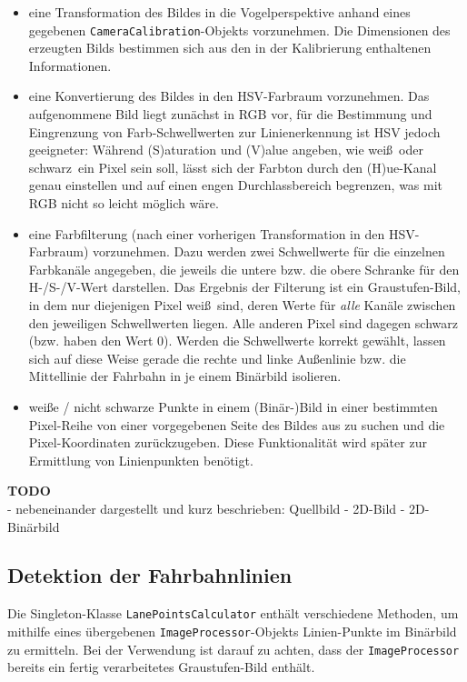 \begin{itemize}
	\item eine Transformation des Bildes in die Vogelperspektive anhand eines gegebenen
	\texttt{CameraCalibration}-Objekts vorzunehmen. Die Dimensionen des erzeugten Bilds bestimmen sich aus
	den in der Kalibrierung enthaltenen Informationen.
	\item eine Konvertierung des Bildes in den HSV-Farbraum vorzunehmen. Das aufgenommene Bild liegt
	zun\"achst in RGB vor, f\"ur die Bestimmung und Eingrenzung von Farb-Schwellwerten zur Linienerkennung
	ist HSV jedoch geeigneter: W\"ahrend (S)aturation und (V)alue angeben,
	wie \glqq wei\ss \grqq\ oder \glqq schwarz\grqq\ ein Pixel
	sein soll, l\"asst sich der Farbton durch den (H)ue-Kanal genau einstellen und auf einen engen
	Durchlassbereich begrenzen, was mit RGB nicht so leicht m\"oglich w\"are.
	\item eine Farbfilterung (nach einer vorherigen Transformation in den HSV-Farbraum) vorzunehmen. Dazu
	werden zwei Schwellwerte f\"ur die einzelnen Farbkan\"ale angegeben, die jeweils die untere bzw. die
	obere Schranke f\"ur den H-/S-/V-Wert darstellen. Das Ergebnis der Filterung ist ein Graustufen-Bild,
	in dem nur diejenigen Pixel wei\ss\ sind, deren Werte f\"ur \textit{alle} Kan\"ale zwischen den
	jeweiligen Schwellwerten liegen. Alle anderen Pixel sind dagegen schwarz (bzw. haben den Wert 0).
	Werden die Schwellwerte korrekt gew\"ahlt, lassen sich auf diese Weise gerade die rechte und linke
	Au\ss enlinie bzw. die Mittellinie der Fahrbahn in je einem Bin\"arbild isolieren.
	\item wei\ss e / nicht schwarze Punkte in einem (Bin\"ar-)Bild in einer bestimmten Pixel-Reihe
	von einer vorgegebenen Seite des Bildes aus zu suchen und die Pixel-Koordinaten zur\"uckzugeben.
	Diese Funktionalit\"at wird sp\"ater zur Ermittlung von Linienpunkten ben\"otigt.
\end{itemize} 

\textbf{TODO}\\
- nebeneinander dargestellt und kurz beschrieben: Quellbild - 2D-Bild - 2D-Bin\"arbild\\

\subsection{Detektion der Fahrbahnlinien}

Die Singleton-Klasse \texttt{LanePointsCalculator} enth\"alt verschiedene Methoden, um mithilfe eines
\"ubergebenen \texttt{ImageProcessor}-Objekts Linien-Punkte im Bin\"arbild zu ermitteln. Bei der
Verwendung ist darauf zu achten, dass der \texttt{ImageProcessor} bereits ein fertig verarbeitetes
Graustufen-Bild enth\"alt.\\

